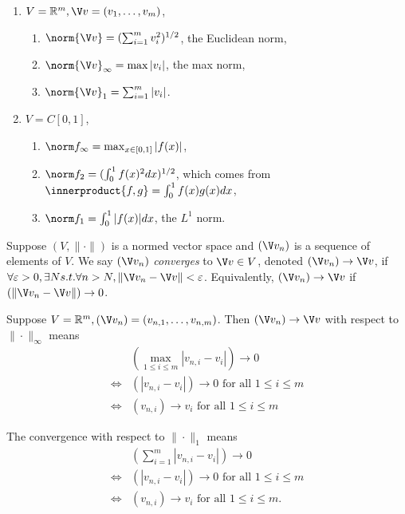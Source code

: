 \documentclass[a4paper]{article}
\theoremstyle{definition}
\begin{document}
\begin{eg}\leavevmode
  \begin{enumerate}
  \item $V= \mathbb{R}^m, \V v = (v_1,\ldots,v_m)$,
    \begin{enumerate}
    \item $\norm{\V v} = (\sum_{i=1}^m v_i^2)^{1/2}$, the Euclidean norm,
    \item $\norm{\V v}_\infty = \max |v_i|$, the max norm,
    \item $\norm{\V v}_1 = \sum_{i=1}^m |v_i|$.
    \end{enumerate}
  \item $V = C[0, 1]$,
    \begin{enumerate}
    \item $\norm f_\infty=\max_{x\in[0,1]} |f(x)|$,
    \item $\norm f_2 = (\int_0^1 f(x)^2 dx)^{1/2}$, which comes from $\innerproduct{f, g} = \int_0^1f(x)g(x) dx$,
    \item $\norm f_1 = \int_0^1|f(x)| dx$, the $L^1$ norm.
    \end{enumerate}
  \end{enumerate}
\end{eg}

\begin{definition}[Convergence]
  Suppose $(V, \|\cdot\|)$ is a normed vector space and $(\V v_n)$ is a sequence of elements of $V$. We say $(\V v_n)$ \emph{converges} to $\V v\in V$, denoted $(\V v_n)\to \V v$, if $\forall\varepsilon>0,\exists N s.t. \forall n>N, \|\V v_n-\V v\|<\varepsilon$. Equivalently, $(\V v_n)\to \V v$ if $(\|\V v_n-\V v\|)\to 0$.
\end{definition}

\begin{ex}
  Suppose $V=\mathbb{R}^m, (\V v_n) = (v_{n,1},\ldots,v_{n,m})$. Then $(\V v_n)\to \V v$ with respect to $\|\cdot\|_\infty$ means
  \begin{align*}
    & \left( \max_{1\leq i \leq m}|v_{n,i}-v_i| \right) \to 0 \\
    \Longleftrightarrow & (|v_{n,i}-v_i|)\to 0 \text{ for all } 1\leq i\leq m \\
    \Longleftrightarrow & (v_{n,i})\to v_i \text{ for all } 1\leq i\leq m
  \end{align*}

   The convergence with respect to $\|\cdot\|_1$ means
   \begin{align*}
     & \left( \sum_{i=1}^m |v_{n,i}-v_i| \right) \to 0 \\
     \Longleftrightarrow & \left( |v_{n,i}-v_i| \right)\to 0 \text{ for all } 1\leq i\leq m \\ 
    \Longleftrightarrow & (v_{n,i})\to v_i \text{ for all } 1\leq i\leq m.
  \end{align*}
\end{ex}
\end{document}
